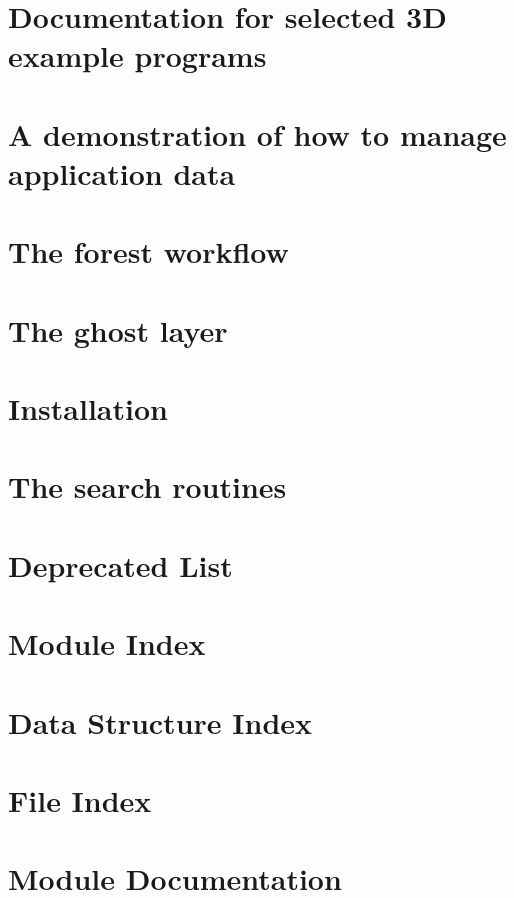 \let\mypdfximage\pdfximage\def\pdfximage{\immediate\mypdfximage}\documentclass[twoside]{book}
\newcommand{\+}{\discretionary{\mbox{\scriptsize$\hookleftarrow$}}{}{}}
\begin{document}
\chapter{Documentation for selected 3D example programs}
\label{example_simple3}

\chapter{A demonstration of how to manage application data}
\label{example_userdata}

\chapter{The forest workflow}
\label{forest}

\chapter{The ghost layer}
\label{ghost}

\chapter{Installation}
\label{installing_p4est}

\chapter{The search routines}
\label{search}

\chapter{Deprecated List}
\label{deprecated}

\chapter{Module Index}

\chapter{Data Structure Index}

\chapter{File Index}

\chapter{Module Documentation}



\end{document}
